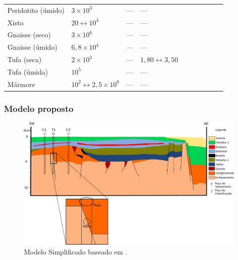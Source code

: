 \documentclass[10pt]{beamer} %
\begin{document}
\begin{frame}
\begin{scriptsize}
\begin{table}[H]
\begin{tabular}{@{}llllllllll@{}}
				Peridotito (úmido) &    $3\times10^{3}$       &      ---         &      ---      &  \\
				Xisto &    $20\leftrightarrow10^{4}$       &        ---       &       ---     &   \\
				Gnaisse (seco) & $3\times10^{6}$          &         ---      &     ---       &   \\
				Gnaisse (úmido) &   $6,8\times10^{4}$        &       ---        &      ---      &   \\
				Tufa (seca) &      $2\times10^{3}$     &      ---         &     $1,80\leftrightarrow3,50$       &     \\
				Tufa (úmida) &     $10^{5}$      &     ---          &     ---       &      \\
				Mármore &  $10^{2}\leftrightarrow2,5\times10^{8}$         &       ---        &      ---      &    \\ \bottomrule
			\end{tabular}
		\end{table}
	\end{scriptsize}
\end{frame}



\begin{frame}
	\frametitle{Modelo proposto}
	\begin{figure}[H]
		\centering
			\includegraphics[scale=0.35]{Imagens/Modelo.png}
		\caption{Modelo Simplificado baseado em \cite{Sal2008}.}
		\label{modelo}
	\end{figure}
\end{frame}
\end{document}
